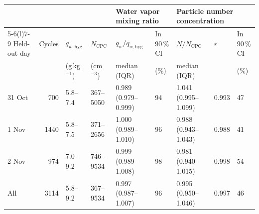 \begin{tabular}{lrlllllll}
\toprule
 & & & & \multicolumn{2}{l}{Water vapor mixing ratio} & \multicolumn{3}{l}{Particle number concentration} \\
\cmidrule(lr){5-6}\cmidrule(l){7-9}
Held-out day & Cycles & $q_{w,\mathrm{hyg}}$ & $N_\mathrm{CPC}$ & $q_w/q_{w,\mathrm{hyg}}$ & In 90\,\% CI & $N/N_\mathrm{CPC}$ & $r$ & In 90\,\% CI \\
 & & (g\,kg$^{-1}$) & (cm$^{-3}$) & median (IQR) & (\%) & median (IQR) & & (\%) \\
\midrule
31 Oct & 700 & 5.8--7.4 & 367--5050 & 0.989 (0.979--0.999) & 94 & 1.041 (0.995--1.099) & 0.993 & 47 \\
1 Nov & 1440 & 5.8--7.5 & 371--2656 & 1.000 (0.989--1.010) & 96 & 0.988 (0.943--1.043) & 0.988 & 41 \\
2 Nov & 974 & 7.0--9.2 & 746--9534 & 0.999 (0.989--1.008) & 98 & 0.981 (0.940--1.015) & 0.998 & 54 \\
\midrule
All & 3114 & 5.8--9.2 & 367--9534 & 0.997 (0.987--1.007) & 96 & 0.995 (0.950--1.046) & 0.997 & 46 \\
\bottomrule
\end{tabular}
